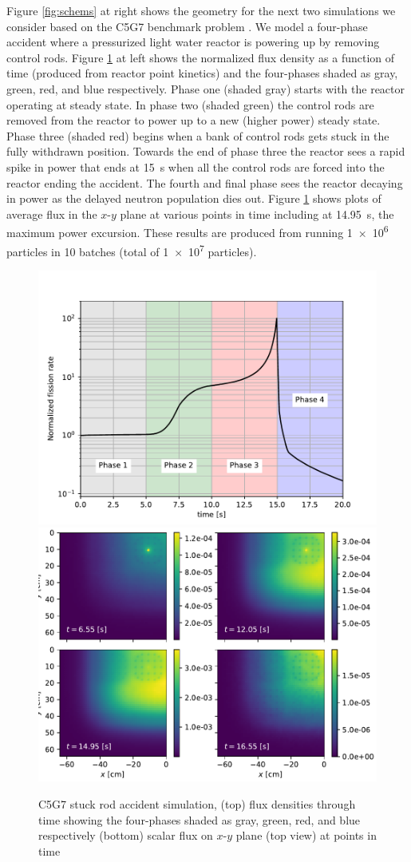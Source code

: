 Figure \ref{fig:schems} at right shows the geometry for the next two simulations we consider based on the C5G7 benchmark problem \cite{jia_hou_oecdnea_2017}.
We model a four-phase accident where a pressurized light water reactor is powering up by removing control rods.
Figure \ref{fig:c5g7} at left shows the normalized flux density as a function of time (produced from reactor point kinetics) and the four-phases shaded as gray, green, red, and blue respectively.
Phase one (shaded gray) starts with the reactor operating at steady state.
In phase two (shaded green) the control rods are removed from the reactor to power up to a new (higher power) steady state.
Phase three (shaded red) begins when a bank of control rods gets stuck in the fully withdrawn position.
Towards the end of phase three the reactor sees a rapid spike in power that ends at \SI{15}{\s} when all the control rods are forced into the reactor ending the accident.
The fourth and final phase sees the reactor decaying in power as the delayed neutron population dies out.
Figure \ref{fig:c5g7} shows plots of average flux in the $x$-$y$ plane at various points in time including at \SI{14.95}{\s}, the maximum power excursion.
These results are produced from running \num{1e6} particles in \num{10} batches (total of \num{1e7} particles).

\begin{figure}
    \centering
    \includegraphics[width=.7\linewidth]{figures/delta_figs/c5/acc.pdf}
    \vspace{2em}
    \includegraphics[width=.75\linewidth]{figures/delta_figs/c5/flux.pdf}
    \caption{C5G7 stuck rod accident simulation, (top) flux densities through time showing the four-phases shaded as gray, green, red, and blue respectively (bottom) scalar flux on $x$-$y$  plane (top view) at points in time}
    \label{fig:c5g7}
\end{figure}

